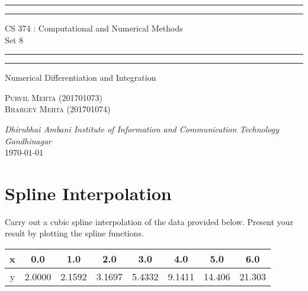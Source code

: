 \documentclass{article}
\begin{document}
\begin{titlepage}
	\centering 
	\scshape
	\vspace*{\baselineskip}
	\rule{\textwidth}{1.6pt}\vspace*{-\baselineskip}\vspace*{2pt}
	\rule{\textwidth}{0.4pt} 
	\vspace{0.75\baselineskip}
	
	{\Large CS 374 : Computational and Numerical Methods \\\vspace{0.75\baselineskip} Set 8}
	\vspace{0.75\baselineskip}
	
	\rule{\textwidth}{0.4pt}\vspace*{-\baselineskip}\vspace{3.2pt} 
	\rule{\textwidth}{1.6pt}
	
	\vspace{2\baselineskip}  
	Numerical Differentiation and Integration
	
	\vspace*{3\baselineskip}
	
	\vspace{0.5\baselineskip} %
	
	{\scshape\large Purvil Mehta (201701073) \\ Bhargey Mehta (201701074) \\} 
	
	\vspace{1\baselineskip} 
	
	\textit{Dhirubhai Ambani Institute of Information and Communication Technology \\ Gandhinagar\\} 
	\vspace*{2\baselineskip}
	\today


\end{titlepage}

\newpage
\tableofcontents
\newpage
\section{Spline Interpolation}
Carry out a cubic spline interpolation of the data provided below. Present your result by plotting the spline functions.
\begin{table}[!h]
\begin{tabular}{|c|c|c|c|c|c|c|c|}\hline
x&0.0    & 1.0    & 2.0    & 3.0    & 4.0    & 5.0    & 6.0    \\\hline
y&2.0000 & 2.1592 & 3.1697 & 5.4332 & 9.1411 & 14.406 & 21.303 \\ \hline
\end{tabular}
\end{table}
\end{document}
